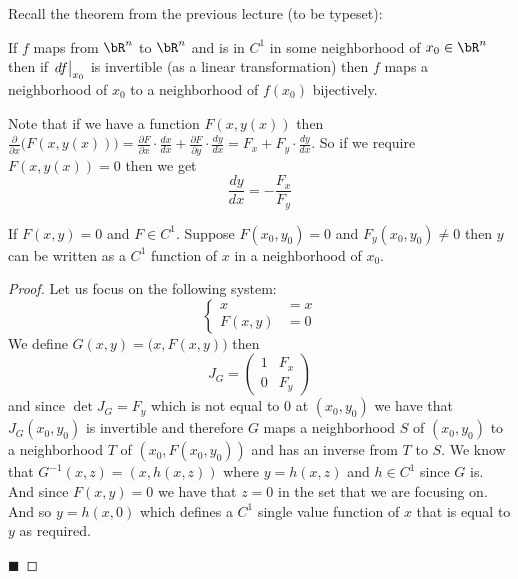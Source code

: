 \documentclass[10pt]{article}
\def\pdv#1#2{\frac{\partial #1}{\partial #2}}
\def\differ#1#2{\left.d#1\strut\right|_{#2}}
\begin{document}


\bigskip

Recall the theorem from the previous lecture (to be typeset):
\begin{thrm}

    If $f$ maps from $\bR^n$ to $\bR^n$ and is in $C^1$ in some neighborhood of $x_0\in\bR^n$ then if $\differ f{x_0}$ is invertible (as a linear transformation) then $f$ maps a neighborhood of $x_0$ to
    a neighborhood of $f(x_0)$ bijectively.

\end{thrm}

Note that if we have a function $F(x,y(x))$ then $\frac\partial{\partial x}\bigl(F(x,y(x))\bigr)=\pdv Fx\cdot\frac{dx}{dx}+\pdv Fy\cdot\frac{dy}{dx}=F_x+F_y\cdot\frac{dy}{dx}$.
So if we require $F(x,y(x))=0$ then we get
\[ \frac{dy}{dx} = -\frac{F_x}{F_y} \]

\begin{prop*}

    If $F(x,y)=0$ and $F\in C^1$.
    Suppose $F(x_0,y_0)=0$ and $F_y(x_0,y_0)\neq0$ then $y$ can be written as a $C^1$ function of $x$ in a neighborhood of $x_0$.

\end{prop*}

\begin{proof}

    Let us focus on the following system:
    \[ \left\{\begin{aligned} x&=x \\ F(x,y)&=0 \end{aligned}\right. \]
    We define $G(x,y)=\bigl(x,F(x,y)\bigr)$ then
    \[ J_G = \begin{pmatrix} 1 & F_x \\ 0 & F_y \end{pmatrix} \]
    and since $\det J_G=F_y$ which is not equal to $0$ at $(x_0,y_0)$ we have that $J_G(x_0,y_0)$ is invertible and therefore $G$ maps a neighborhood $S$ of $(x_0,y_0)$ to a neighborhood $T$ of
    $(x_0,F(x_0,y_0))$ and has an inverse from $T$ to $S$.
    We know that $G^{-1}(x,z)=(x,h(x,z))$ where $y=h(x,z)$ and $h\in C^1$ since $G$ is.
    And since $F(x,y)=0$ we have that $z=0$ in the set that we are focusing on.
    And so $y=h(x,0)$ which defines a $C^1$ single value function of $x$ that is equal to $y$ as required.

    \hfill$\blacksquare$

\end{proof}
\end{document}

